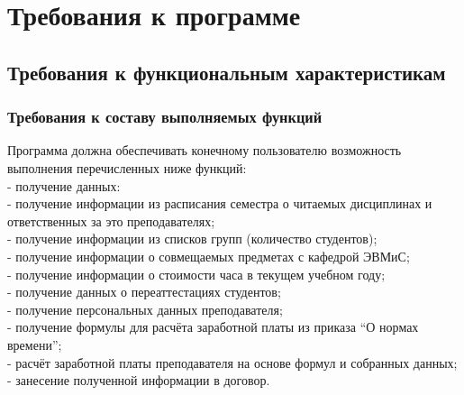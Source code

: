 \documentclass{article}
\begin{document}
\section{Требования к программе}
    \subsection{Требования к функциональным характеристикам}
        \subsubsection{Требования к составу выполняемых функций}
        Программа должна обеспечивать конечному пользователю возможность выполнения перечисленных ниже функций:\\
        - получение данных:\\
            \hspace*{3em} - получение информации из расписания семестра о читаемых дисциплинах и ответственных за это преподавателях;\\
            \hspace*{3em} - получение информации из списков групп (количество студентов);\\
            \hspace*{3em} - получение информации о совмещаемых предметах с кафедрой ЭВМиС;\\
            \hspace*{3em} - получение информации о стоимости часа в текущем учебном году;\\
            \hspace*{3em} - получение данных о переаттестациях студентов;\\
            \hspace*{3em} - получение персональных данных преподавателя;\\
            \hspace*{3em} - получение формулы для расчёта заработной платы из приказа “О нормах времени”;\\
        - расчёт заработной платы преподавателя на основе формул и собранных данных;\\
        - занесение полученной информации в договор.\\
       
\end{document}
